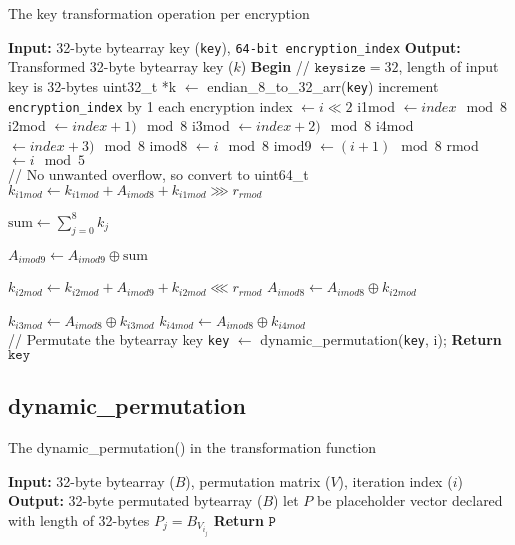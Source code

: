 \documentclass[fleqn, a4paper,12pt]{article}
\newcommand{\COMMENT}[1]{\State \textcolor[HTML]{003e57}{// #1}}
\begin{document}
\begin{algorithm}[H] %
\caption{The key transformation operation per encryption}
\begin{algorithmic}[1]  %
\State \textbf{Input:} 32-byte bytearray key (\texttt{key}), \texttt{64-bit encryption\_index}
\State \textbf{Output:} Transformed 32-byte bytearray key ($k$)
\State \textbf{Begin}
\COMMENT{$\texttt{keysize} = 32$, length of input key is 32-bytes}
\State uint32\_t *k $\gets$ endian\_8\_to\_32\_arr(\texttt{key})
\State increment \texttt{encryption\_index} by 1 each encryption
	\State index $\gets i \ll 2$
	\State i1mod $\gets index \mod 8$
	\State i2mod $\gets index+1) \mod 8$
	\State i3mod $\gets index+2) \mod 8$
	\State i4mod $\gets index+3) \mod 8$
	\State imod8 $\gets i \mod 8$
	\State imod9 $\gets (i+1) \mod 8$
	\State rmod $\gets i \mod 5$ \\

	\COMMENT{No unwanted overflow, so convert to uint64\_t}
	\State $k_{i1mod} \gets k_{i1mod} + A_{imod8} + k_{i1mod} \ggg r_{rmod}$

	\State $ \text{sum} \gets \displaystyle \sum_{j=0}^8 k_j$

	\State $A_{imod9} \gets A_{imod9} \oplus \text{sum}$

	\State $k_{i2mod} \gets k_{i2mod} + A_{imod9} + k_{i2mod} \lll r_{rmod}$
	\State $A_{imod8} \gets A_{imod8} \oplus k_{i2mod}$

	\State $k_{i3mod} \gets A_{imod8} \oplus k_{i3mod}$
	\State $k_{i4mod} \gets A_{imod8} \oplus k_{i4mod}$ \\

	\COMMENT{Permutate the bytearray key}
	\State \texttt{key} $\gets$ dynamic\_permutation(\texttt{key}, i);
\EndFor
\State \textbf{Return} $\texttt{key}$
\end{algorithmic}
\end{algorithm}

\subsection{dynamic\_permutation} \label{dynamic_permutation}

\begin{algorithm}[H] %
\caption{The dynamic\_permutation() in the transformation function}
\begin{algorithmic}[1]  %
\State \textbf{Input:} 32-byte bytearray ($B$), permutation matrix ($V$), iteration index ($i$)
\State \textbf{Output:} 32-byte permutated bytearray ($B$)
\State let $P$ be placeholder vector declared with length of 32-bytes
		\State $P_j = B_{V_{i_j}}$
\EndFor
\State \textbf{Return} $\texttt{P}$
\end{algorithmic}
\end{algorithm}
\end{document}
